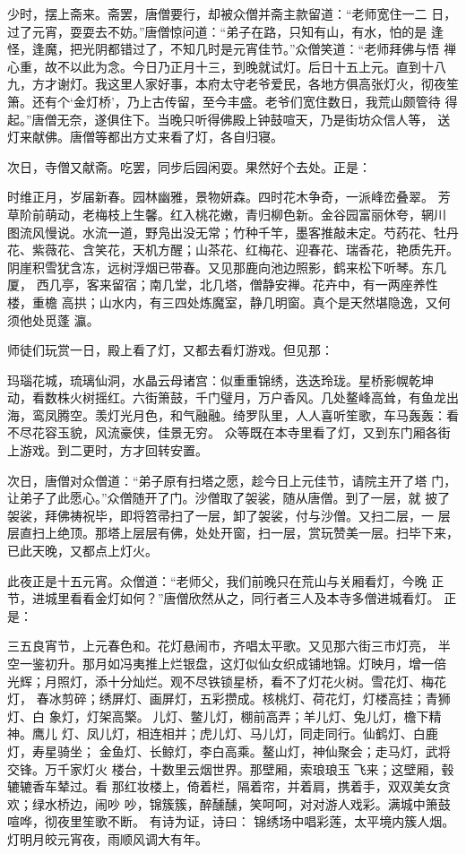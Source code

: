 少时，摆上斋来。斋罢，唐僧要行，却被众僧并斋主款留道：“老师宽住一二
日，过了元宵，耍耍去不妨。”唐僧惊问道：“弟子在路，只知有山，有水，怕的是
逢怪，逢魔，把光阴都错过了，不知几时是元宵佳节。”众僧笑道：“老师拜佛与悟
禅心重，故不以此为念。今日乃正月十三，到晚就试灯。后日十五上元。直到十八
九，方才谢灯。我这里人家好事，本府太守老爷爱民，各地方俱高张灯火，彻夜笙
箫。还有个‘金灯桥’，乃上古传留，至今丰盛。老爷们宽住数日，我荒山颇管待
得起。”唐僧无奈，遂俱住下。当晚只听得佛殿上钟鼓喧天，乃是街坊众信人等，
送灯来献佛。唐僧等都出方丈来看了灯，各自归寝。

次日，寺僧又献斋。吃罢，同步后园闲耍。果然好个去处。正是：

时维正月，岁届新春。园林幽雅，景物妍森。四时花木争奇，一派峰峦叠翠。
芳草阶前萌动，老梅枝上生馨。红入桃花嫩，青归柳色新。金谷园富丽休夸，辋川
图流风慢说。水流一道，野凫出没无常；竹种千竿，墨客推敲未定。芍药花、牡丹
花、紫薇花、含笑花，天机方醒；山茶花、红梅花、迎春花、瑞香花，艳质先开。
阴崖积雪犹含冻，远树浮烟已带春。又见那鹿向池边照影，鹤来松下听琴。东几厦，
西几亭，客来留宿；南几堂，北几塔，僧静安禅。花卉中，有一两座养性楼，重檐
高拱；山水内，有三四处炼魔室，静几明窗。真个是天然堪隐逸，又何须他处觅蓬
瀛。

师徒们玩赏一日，殿上看了灯，又都去看灯游戏。但见那：

玛瑙花城，琉璃仙洞，水晶云母诸宫：似重重锦绣，迭迭玲珑。星桥影幌乾坤
动，看数株火树摇红。六街箫鼓，千门璧月，万户香风。几处鳌峰高耸，有鱼龙出
海，鸾凤腾空。羡灯光月色，和气融融。绮罗队里，人人喜听笙歌，车马轰轰：看
不尽花容玉貌，风流豪侠，佳景无穷。
众等既在本寺里看了灯，又到东门厢各街上游戏。到二更时，方才回转安置。

次日，唐僧对众僧道：“弟子原有扫塔之愿，趁今日上元佳节，请院主开了塔
门，让弟子了此愿心。”众僧随开了门。沙僧取了袈裟，随从唐僧。到了一层，就
披了袈裟，拜佛祷祝毕，即将笤帚扫了一层，卸了袈裟，付与沙僧。又扫二层，一
层层直扫上绝顶。那塔上层层有佛，处处开窗，扫一层，赏玩赞美一层。扫毕下来，
已此天晚，又都点上灯火。

此夜正是十五元宵。众僧道：“老师父，我们前晚只在荒山与关厢看灯，今晚
正节，进城里看看金灯如何？”唐僧欣然从之，同行者三人及本寺多僧进城看灯。
正是：

三五良宵节，上元春色和。花灯悬闹市，齐唱太平歌。又见那六街三市灯亮，
半空一鉴初升。那月如冯夷推上烂银盘，这灯似仙女织成铺地锦。灯映月，增一倍
光辉；月照灯，添十分灿烂。观不尽铁锁星桥，看不了灯花火树。雪花灯、梅花灯，
春冰剪碎；绣屏灯、画屏灯，五彩攒成。核桃灯、荷花灯，灯楼高挂；青狮灯、白
象灯，灯架高檠。儿灯、鳖儿灯，棚前高弄；羊儿灯、兔儿灯，檐下精神。鹰儿
灯、凤儿灯，相连相并；虎儿灯、马儿灯，同走同行。仙鹤灯、白鹿灯，寿星骑坐；
金鱼灯、长鲸灯，李白高乘。鳌山灯，神仙聚会；走马灯，武将交锋。万千家灯火
楼台，十数里云烟世界。那壁厢，索琅琅玉飞来；这壁厢，毂辘辘香车辇过。看
那红妆楼上，倚着栏，隔着帘，并着肩，携着手，双双美女贪欢；绿水桥边，闹吵
吵，锦簇簇，醉醺醺，笑呵呵，对对游人戏彩。满城中箫鼓喧哗，彻夜里笙歌不断。
有诗为证，诗曰：
锦绣场中唱彩莲，太平境内簇人烟。
灯明月皎元宵夜，雨顺风调大有年。


